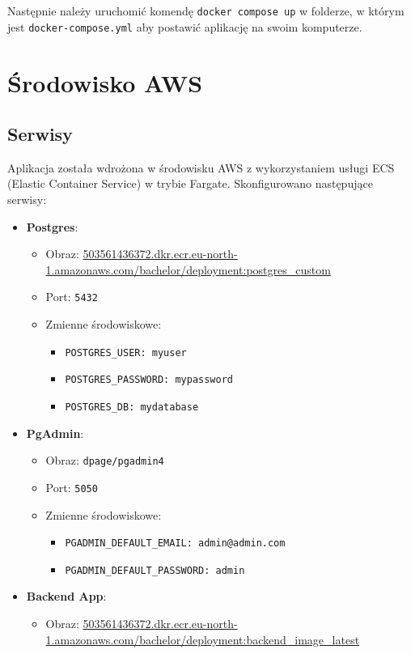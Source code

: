 Następnie należy uruchomić komendę \texttt{docker compose up} w folderze, w którym jest \texttt{docker-compose.yml} aby postawić aplikację na swoim komputerze.

\section{Środowisko AWS}
\subsection{Serwisy}
Aplikacja została wdrożona w środowisku AWS z wykorzystaniem usługi ECS (Elastic Container Service) w trybie Fargate. Skonfigurowano następujące serwisy:
\begin{itemize}
    \item \textbf{Postgres}:
    \begin{itemize}
        \item Obraz: \url{503561436372.dkr.ecr.eu-north-1.amazonaws.com/bachelor/deployment:postgres_custom}
        \item Port: \texttt{5432}
        \item Zmienne środowiskowe:
        \begin{itemize}
            \item \texttt{POSTGRES\_USER: myuser}
            \item \texttt{POSTGRES\_PASSWORD: mypassword}
            \item \texttt{POSTGRES\_DB: mydatabase}
        \end{itemize}
    \end{itemize}
    \item \textbf{PgAdmin}:
    \begin{itemize}
        \item Obraz: \texttt{dpage/pgadmin4}
        \item Port: \texttt{5050}
        \item Zmienne środowiskowe:
        \begin{itemize}
            \item \texttt{PGADMIN\_DEFAULT\_EMAIL: admin@admin.com}
            \item \texttt{PGADMIN\_DEFAULT\_PASSWORD: admin}
        \end{itemize}
    \end{itemize}
    \item \textbf{Backend App}:
    \begin{itemize}
        \item Obraz: \url{503561436372.dkr.ecr.eu-north-1.amazonaws.com/bachelor/deployment:backend_image_latest}

\end{itemize}
\end{itemize}
